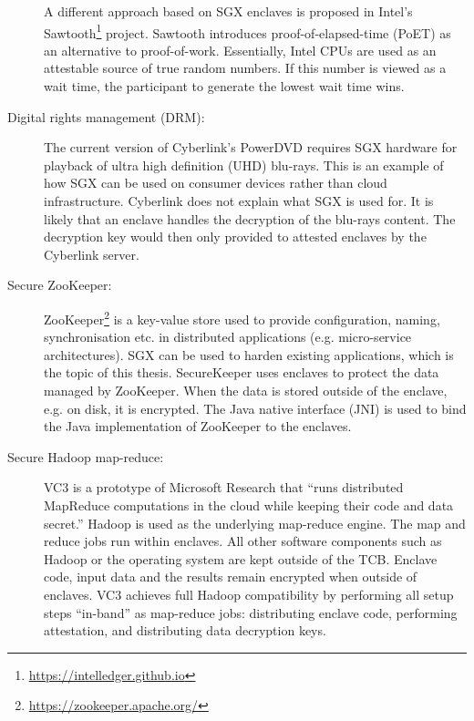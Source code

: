 \begin{description}
A different approach based on SGX enclaves is proposed in Intel's Sawtooth\footnote{\url{https://intelledger.github.io}} project.\label{ID_1210248514}
Sawtooth introduces proof-of-elapsed-time (PoET) as an alternative to proof-of-work.\label{ID_1984325994}
Essentially, Intel CPUs are used as an attestable source of true random numbers. If this number is viewed as a wait time, the participant to generate the lowest wait time wins.\cite[]{Intel}\label{ID_359563617}
\item[Digital rights management (DRM):]\label{ID_951757571}
The current version of Cyberlink's PowerDVD requires SGX hardware for playback of ultra high definition (UHD) blu-rays.\cite[]{powerdvd}\label{ID_1044376464}
This is an example of how SGX can be used on consumer devices rather than cloud infrastructure.\label{ID_1177830256}
Cyberlink does not explain what SGX is used for. It is likely that an enclave handles the decryption of the blu-rays content.\label{ID_1342908426}
The decryption key would then only provided to attested enclaves by the Cyberlink server.\label{ID_294479514}
\item[Secure ZooKeeper:]\label{ID_1198544376}
ZooKeeper\footnote{\url{https://zookeeper.apache.org/}} is a key-value store used to provide configuration, naming, synchronisation etc. in distributed applications (e.g. micro-service architectures).\label{ID_1070130646}
SGX can be used to harden existing applications, which is the topic of this thesis.\label{ID_277356659}
SecureKeeper uses enclaves to protect the data managed by ZooKeeper.\label{ID_1700491540}
When the data is stored outside of the enclave, e.g. on disk, it is encrypted.\label{ID_204377492}
The Java native interface (JNI) is used to bind the Java implementation of ZooKeeper to the enclaves.\cite[]{Brenner2016}\label{ID_808626981}
\item[Secure Hadoop map-reduce:]\label{ID_1200794013}
VC3 is a prototype of Microsoft Research that ``runs distributed MapReduce computations in the cloud while keeping their code and data secret.''\label{ID_1876953859}
Hadoop is used as the underlying map-reduce engine.\label{ID_956606489}
The map and reduce jobs run within enclaves.\label{ID_1313741719}
All other software components such as Hadoop or the operating system are kept outside of the TCB.\label{ID_1560260688}
Enclave code, input data and the results remain encrypted when outside of enclaves.\label{ID_1156084768}
VC3 achieves full Hadoop compatibility by performing all setup steps ``in-band'' as map-reduce jobs: distributing enclave code, performing attestation, and distributing data decryption keys.\cite[]{Schuster2015}\label{ID_322840088}
\end{description}\label{ID_1340304870}

